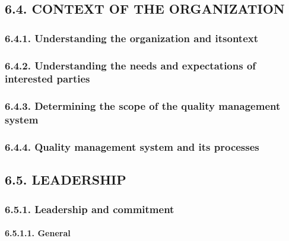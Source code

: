 \documentclass[
]{article}
\begin{document}
\hypertarget{context-of-the-organization-1}{%
\subsection{6.4. CONTEXT OF THE
ORGANIZATION}\label{context-of-the-organization-1}}

\hypertarget{understanding-the-organization-and-itsontext-1}{%
\subsubsection{6.4.1. Understanding the organization and
itsontext}\label{understanding-the-organization-and-itsontext-1}}

\hypertarget{understanding-the-needs-and-expectations-of-interested-parties-1}{%
\subsubsection{6.4.2. Understanding the needs and expectations of
interested
parties}\label{understanding-the-needs-and-expectations-of-interested-parties-1}}

\hypertarget{determining-the-scope-of-the-quality-management-system-1}{%
\subsubsection{6.4.3. Determining the scope of the quality management
system}\label{determining-the-scope-of-the-quality-management-system-1}}

\hypertarget{quality-management-system-and-its-processes-1}{%
\subsubsection{6.4.4. Quality management system and its
processes}\label{quality-management-system-and-its-processes-1}}

\hypertarget{leadership-1}{%
\subsection{6.5. LEADERSHIP}\label{leadership-1}}

\hypertarget{leadership-and-commitment-1}{%
\subsubsection{6.5.1. Leadership and
commitment}\label{leadership-and-commitment-1}}

\hypertarget{general-9}{%
\paragraph{6.5.1.1. General}\label{general-9}}
\end{document}
